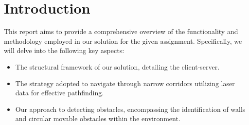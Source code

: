 \section{Introduction}
This report aims to provide a comprehensive overview of the functionality and methodology employed in our solution for the given assignment. Specifically, we will delve into the following key aspects:
\begin{itemize}
	\item The structural framework of our solution, detailing the client-server.
	\item The strategy adopted to navigate through narrow corridors utilizing laser data for effective pathfinding.
	\item Our approach to detecting obstacles, encompassing the identification of walls and circular movable obstacles within the environment.
\end{itemize}
